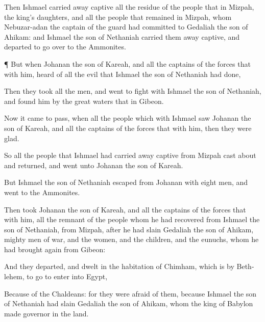 {Then
Ishmael carried away
captive all the
residue of the
people that
{} in
Mizpah,
{} the
king’s
daughters, and all the
people that
remained in
Mizpah, whom
Nebuzar-adan the
captain of the
guard had
committed to
Gedaliah the
son of
Ahikam: and
Ishmael the
son of
Nethaniah carried them away
captive, and
departed to go
over to the
Ammonites.


\par }{\PP {}¶ But when
Johanan the
son of
Kareah, and all the
captains of the
forces that
{} with him,
heard of all the
evil that
Ishmael the
son of
Nethaniah had
done,

Then they
took all the
men, and
went to
fight with
Ishmael the
son of
Nethaniah, and
found him by the
great
waters that
{} in
Gibeon.

Now it came to pass,
{} when all the
people which
{} with
Ishmael
saw
Johanan the
son of
Kareah, and all the
captains of the
forces that
{} with him, then they were
glad.

So all the
people that
Ishmael had carried away
captive from
Mizpah cast
about and
returned, and
went unto
Johanan the
son of
Kareah.

But
Ishmael the
son of
Nethaniah
escaped
from
Johanan with
eight
men, and
went to the
Ammonites.

Then
took
Johanan the
son of
Kareah, and all the
captains of the
forces that
{} with him, all the
remnant of the
people whom he had
recovered from
Ishmael the
son of
Nethaniah, from
Mizpah,
after
{} he had
slain
Gedaliah the
son of
Ahikam,
{}
mighty
men of
war, and the
women, and the
children, and the
eunuchs, whom he had brought
again from
Gibeon:

And they
departed, and dwelt
in the
habitation of
Chimham, which is
by
Beth-lehem, to
go to
enter into
Egypt,

Because of the
Chaldeans: for they were
afraid of them, because
Ishmael the
son of
Nethaniah had
slain
Gedaliah the
son of
Ahikam, whom the
king of
Babylon made
governor in the
land.




\par }

